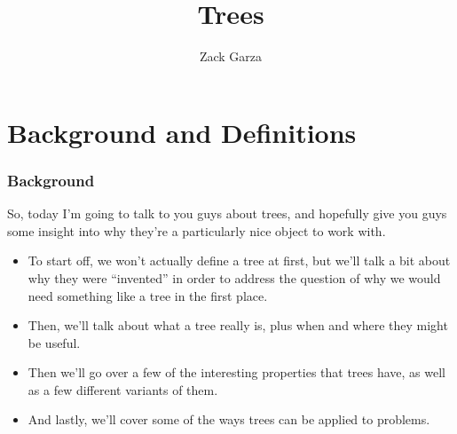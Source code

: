 \documentclass[a4paper,10pt]{report}
\title{Trees}
\author{Zack Garza}
\begin{document}
\maketitle

\begin{abstract}
\tableofcontents
\end{abstract}

\chapter{Background and Definitions}

\subsection{Background}
So, today I'm going to talk to you guys about trees, and hopefully give you guys some insight into why they're a particularly nice object to work with.

\begin{itemize}

\item To start off, we won't actually define a tree at first, but we'll talk a bit about why they were ``invented'' in order to address the question of why we would  need something like a tree in the first place.

\item Then, we'll talk about what a tree really is, plus when and where they might be useful.

\item Then we'll go over a few of the interesting properties that trees have, as well as a few different variants of them.

\item And lastly, we'll cover some of the ways trees can be applied to problems.\\
\end{itemize}
\end{document}
